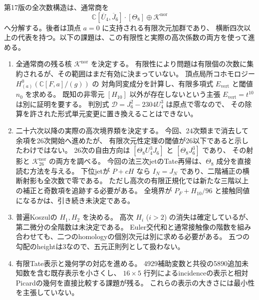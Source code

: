 \documentclass[a4paper,11pt]{ltjsarticle}
\newcommand{\mathscr}{\mathcal}
\theoremstyle{definition}
\begin{document}
第17版の全次数構造は、通常商を
\[
 \mathbb C[\overline U_4,\overline J_6]\cdot[\Theta_8]
 \oplus\mathcal K^{\mathrm{nor}}
\]
へ分解する。後者は頂点 $a=0$ に支持される有限次元加群であり、
横断四次以上の代表を持つ。以下の課題は、この有限性と実際の高次係数の両方を使って進める。
\begin{enumerate}
 \item 全通常商の残る核 $\mathcal K^{\mathrm{nor}}$ を決定する。
 有限性により問題は有限個の次数に集約されるが、その範囲はまだ有効に決まっていない。
 頂点局所コホモロジー $H^0_{(a)}(\mathbb C[F,a]/(g))$ の
 対角同変成分を計算し、有限多項式 $E_{\mathrm{vert}}$ と閾値 $n_0$ を求める。
 既知の非零元 $[H_{10}]$ 以外が存在しないという主張
 $E_{\mathrm{vert}}=t^{10}$ は別に証明を要する。
 判別式 $\mathscr D=J_6^2-2304U_4^3$ は原点で零なので、
 その除算を許された形式単元変更に置き換えることはできない。

 \item 二十六次以降の実際の高次境界類を決定する。
 今回、24次類まで消去して余項を26次開始へ進めたが、
 有限次元性定理の閾値が26以下であると示したわけではない。
 26次の自由方向は $[\Theta_8U_4^3J_6]$ と $[\Theta_8J_6^3]$ であり、
 その射影と $\mathcal K_{26}^{\mathrm{nor}}$ の両方を調べる。
 今回の法三次jetのTate再帰は、$\Theta_8$ 成分を直接読む方法を与える。
 下位jetが $P+cH$ なら $I_N=J_N$ であり、二階補正の横断射影も全次数で零である。
 ただし高次の有限正規化では新たな三階以上の補正と奇数項を追跡する必要がある。
 全境界が $P_F+H_{10}/96$ と接触同値になるかは、引き続き未決定である。

 \item 普遍Koszulの $H_1,H_2$ を決める。
 高次 $H_i$ ($i>2$) の消失は確定しているが、第二微分の全階数は未決定である。
 Euler交代和と通常接触像の階数を組み合わせても、二つのhomologyの個別次元は別に求める必要がある。
 五つの勾配のheightは3なので、五元正則列として扱わない。

 \item 有限Tate表示と幾何学の対応を進める。
 4929補助変数と共役の5890追加未知数を含む既存表示を小さくし、
 $16\times5$ 行列によるincidenceの表示と相対Picardの幾何を直接比較する課題が残る。
 これらの表示の大きさには最小性を主張していない。


\end{enumerate}
\end{document}
